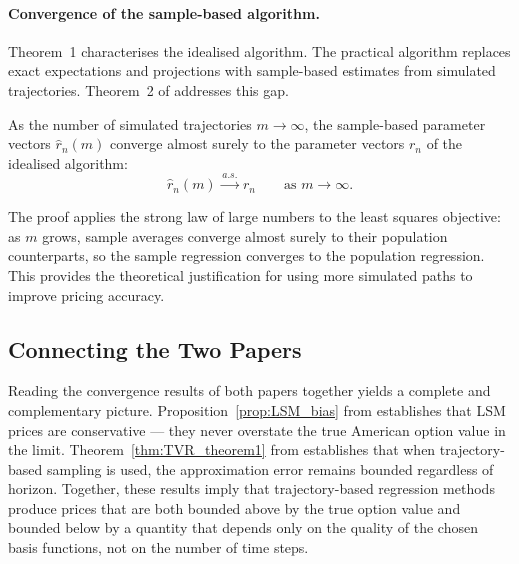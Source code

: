 \paragraph{Convergence of the sample-based algorithm.}
Theorem~1 characterises the idealised algorithm. The practical algorithm
replaces exact expectations and projections with sample-based estimates
from simulated trajectories. Theorem~2 of \citet{tsitsiklis2001} addresses
this gap.

\begin{theorem}
\label{thm:TVR_theorem2}
As the number of simulated trajectories $m \to \infty$, the sample-based
parameter vectors $\hat{r}_n(m)$ converge almost surely to the parameter
vectors $r_n$ of the idealised algorithm:
\begin{equation}
    \hat{r}_n(m) \xrightarrow{\,a.s.\,} r_n
    \qquad \text{as } m \to \infty.
    \label{eq:TVR_as_convergence}
\end{equation}
\end{theorem}

The proof applies the strong law of large numbers to the least squares
objective: as $m$ grows, sample averages converge almost surely to their
population counterparts, so the sample regression converges to the
population regression. This provides the theoretical justification for
using more simulated paths to improve pricing accuracy.

\subsection{Connecting the Two Papers}

Reading the convergence results of both papers together yields a complete
and complementary picture. Proposition~\ref{prop:LSM_bias} from
\citet{longstaff2001} establishes that LSM prices are conservative ---
they never overstate the true American option value in the limit.
Theorem~\ref{thm:TVR_theorem1} from \citet{tsitsiklis2001} establishes
that when trajectory-based sampling is used, the approximation error
remains bounded regardless of horizon. Together, these results imply that
trajectory-based regression methods produce prices that are both bounded
above by the true option value and bounded below by a quantity that depends
only on the quality of the chosen basis functions, not on the number of
time steps.

